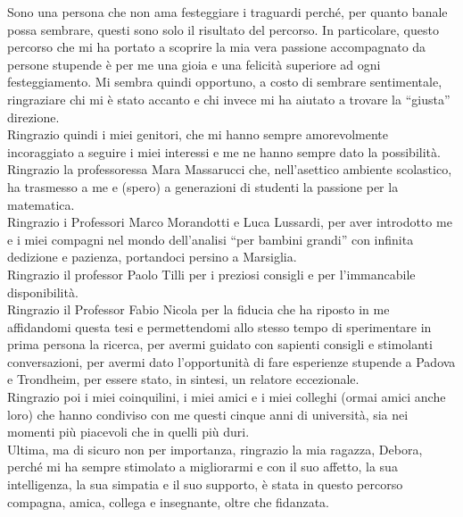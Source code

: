 \documentclass[corpo=11pt, stile=classica, tipotesi=custom,
greek, evenboxes, english]{toptesi}
\numberwithin{equation}{chapter}
\theoremstyle{definition}
\theoremstyle{remark}
\begin{document}
	


\ringraziamenti
Sono una persona che non ama festeggiare i traguardi perché, per quanto banale possa sembrare, questi sono solo il risultato del percorso. In particolare, questo percorso che mi ha portato a scoprire la mia vera passione accompagnato da persone stupende è per me una gioia e una felicità superiore ad ogni festeggiamento.
Mi sembra quindi opportuno, a costo di sembrare sentimentale, ringraziare chi mi è stato accanto e chi invece mi ha aiutato a trovare la ``giusta'' direzione.\\
Ringrazio quindi i miei genitori, che mi hanno sempre amorevolmente incoraggiato a seguire i miei interessi e me ne hanno sempre dato la possibilità.\\
Ringrazio la professoressa Mara Massarucci che, nell'asettico ambiente scolastico, ha trasmesso a me e (spero) a generazioni di studenti la passione per la matematica.\\
Ringrazio i Professori Marco Morandotti e Luca Lussardi, per aver introdotto me e i miei compagni nel mondo dell'analisi ``per bambini grandi'' con infinita dedizione e pazienza, portandoci persino a Marsiglia.\\
Ringrazio il professor Paolo Tilli  per i preziosi consigli e per l'immancabile disponibilità.\\
Ringrazio il Professor Fabio Nicola per la fiducia che ha riposto in me affidandomi questa tesi e permettendomi allo stesso tempo di sperimentare in prima persona la ricerca, per avermi guidato con sapienti consigli e stimolanti conversazioni, per avermi dato l'opportunità di fare esperienze stupende a Padova e Trondheim, per essere stato, in sintesi, un relatore eccezionale.\\
Ringrazio poi i miei coinquilini, i miei amici e i miei colleghi (ormai amici anche loro) che hanno condiviso con me questi cinque anni di università, sia nei momenti più piacevoli che in quelli più duri.\\
Ultima, ma di sicuro non per importanza, ringrazio la mia ragazza, Debora, perché mi ha sempre stimolato a migliorarmi e con il suo affetto, la sua intelligenza, la sua simpatia e il suo supporto, è stata in questo percorso compagna, amica, collega e insegnante, oltre che fidanzata.
\end{document}
